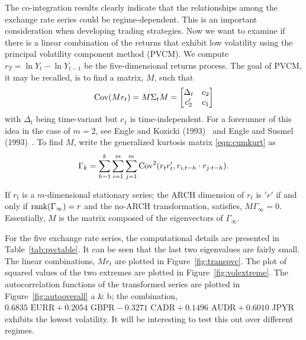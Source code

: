 	
The co-integration results clearly indicate that the relationships among the exchange rate series could be regime-dependent. This is an important consideration when developing trading strategies. Now we want to examine if there is a linear combination of the returns that exhibit low volatility using the principal volatility component method (PVCM). We compute $r_T=\ln Y_t - \ln Y_{t-1}$ be the five-dimensional returns process. The goal of PVCM, it may be recalled, is to find a matrix, $M$, such that
	\begin{equation} \label{eqn:covmatrixM}
	\cov(Mr_t)= M \Sigma_t M= 
	\begin{bmatrix}
	\Delta_t & c_2 \\
	c_2' & c_1
	\end{bmatrix}
	\end{equation}	
with $\Delta_t$ being time-variant but $c_1$ is time-independent. For a forerunner of this idea in the case of $m= 2$, see Engle and Kozicki (1993)~\cite{engle1993testing} and Engle and Susmel (1993)~\cite{engle1993common}. To find $M$, write the generalized kurtosis matrix \eqref{eqn:cumkurt} as
	\begin{equation} \label{eqn:gammakurt}
	\Gamma_k= \sum_{h=1}^k \sum_{i=1}^m \sum_{j=1}^m \cov^2(r_tr_t', r_{i,t-h} \cdot r_{j \cdot t-h}).
	\end{equation}	


\begin{result}
 If $r_t$ is a $m$-dimensional stationary series; the ARCH dimension of $r_t$ is $'r'$ if and only if $\operatorname{rank}(\Gamma_\infty)= r$ and the no-ARCH transformation, satisfies, $M \Gamma_\infty= 0$. Essentially, $M$ is the matrix composed of the eigenvectors of $\Gamma_\infty$.
\end{result}


For the five exchange rate series, the computational details are presented in Table~\ref{tab:pvctable}. It can be seen that the last two eigenvalues are fairly small. The linear combinations, $Mr_t$ are plotted in Figure~\ref{fig:transpvc}. The plot of squared values of the two extremes are plotted in Figure~\ref{fig:volextreme}. The autocorrelation functions of the transformed series are plotted in Figure~\ref{fig:autooverall} a \& b; the combination, $0.6835 \text{ EURR} + 0.2054 \text{ GBPR} - 0.3271 \text{ CADR} + 0.1496 \text{ AUDR} + 0.6010 \text{ JPYR}$ exhibits the lowest volatility. It will be interesting to test this out over different regimes.

